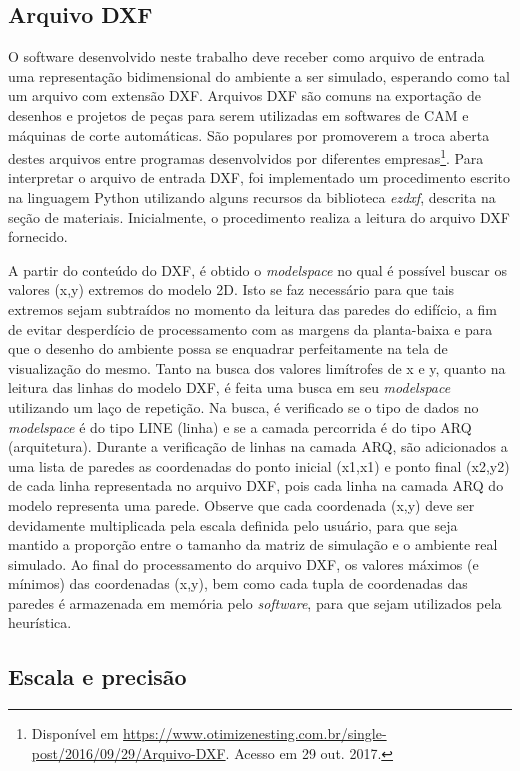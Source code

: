 \documentclass[
	12pt,				%
	twoside,			%
	a4paper,			%
	english,			%
	french,				%
	spanish,			%
	brazil				%
	]{abntex2}
\begin{document}
\subsection{Arquivo DXF}\label{arquivo-dxf}

O software desenvolvido neste trabalho deve receber como arquivo de
entrada uma representação bidimensional do ambiente a ser simulado,
esperando como tal um arquivo com extensão DXF. Arquivos DXF são comuns
na exportação de desenhos e projetos de peças para serem utilizadas em
softwares de CAM e máquinas de corte automáticas. São populares por
promoverem a troca aberta destes arquivos entre programas desenvolvidos
por diferentes empresas\footnote{Disponível em
  \url{https://www.otimizenesting.com.br/single-post/2016/09/29/Arquivo-DXF}.
  Acesso em 29 out. 2017.}. Para interpretar o arquivo de entrada DXF,
foi implementado um procedimento escrito na linguagem Python utilizando
alguns recursos da biblioteca \emph{ezdxf}, descrita na seção de
materiais. Inicialmente, o procedimento realiza a leitura do arquivo DXF
fornecido.

A partir do conteúdo do DXF, é obtido o \emph{modelspace} no qual é
possível buscar os valores (x,y) extremos do modelo 2D. Isto se faz
necessário para que tais extremos sejam subtraídos no momento da leitura
das paredes do edifício, a fim de evitar desperdício de processamento
com as margens da planta-baixa e para que o desenho do ambiente possa se
enquadrar perfeitamente na tela de visualização do mesmo. Tanto na busca
dos valores limítrofes de x e y, quanto na leitura das linhas do modelo
DXF, é feita uma busca em seu \emph{modelspace} utilizando um laço de
repetição. Na busca, é verificado se o tipo de dados no
\emph{modelspace} é do tipo LINE (linha) e se a camada percorrida é do
tipo ARQ (arquitetura). Durante a verificação de linhas na camada ARQ,
são adicionados a uma lista de paredes as coordenadas do ponto inicial
(x1,x1) e ponto final (x2,y2) de cada linha representada no arquivo DXF,
pois cada linha na camada ARQ do modelo representa uma parede. Observe
que cada coordenada (x,y) deve ser devidamente multiplicada pela escala
definida pelo usuário, para que seja mantido a proporção entre o tamanho
da matriz de simulação e o ambiente real simulado. Ao final do
processamento do arquivo DXF, os valores máximos (e mínimos) das
coordenadas (x,y), bem como cada tupla de coordenadas das paredes é
armazenada em memória pelo \emph{software}, para que sejam utilizados
pela heurística.

\subsection{Escala e precisão}\label{escala-e-precisuxe3o}
\end{document}
